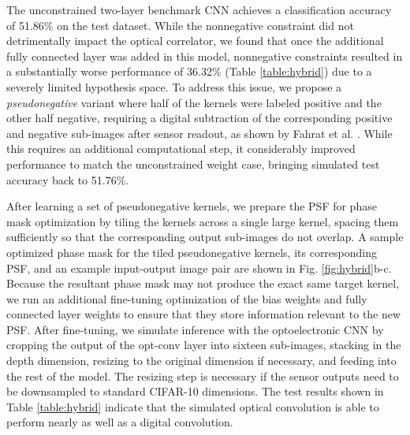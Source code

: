 \documentclass[fleqn,10pt]{wlscirep}
\begin{document}
The unconstrained two-layer benchmark CNN achieves a classification accuracy of 51.86\% on the test dataset. While the nonnegative constraint did not detrimentally impact the optical correlator, we found that once the additional fully connected layer was added in this model, nonnegative constraints resulted in a substantially worse performance of 36.32\% (Table \ref{table:hybrid}) due to a severely limited hypothesis space. To address this issue, we propose a \textit{pseudonegative} variant where half of the kernels were labeled positive and the other half negative, requiring a digital subtraction of the corresponding positive and negative sub-images after sensor readout, as shown by Fahrat et al. \cite{farhat1985optical}. While this requires an additional computational step, it considerably improved performance to match the unconstrained weight case, bringing simulated test accuracy back to 51.76\%.

After learning a set of pseudonegative kernels, we prepare the PSF for phase mask optimization by tiling the kernels across a single large kernel, spacing them sufficiently so that the corresponding output sub-images do not overlap. A sample optimized phase mask for the tiled pseudonegative kernels, its corresponding PSF, and an example input-output image pair are shown in Fig. \ref{fig:hybrid}b-c. Because the resultant phase mask may not produce the exact same target kernel, we run an additional fine-tuning optimization of the bias weights and fully connected layer weights to ensure that they store information relevant to the new PSF. After fine-tuning, we simulate inference with the optoelectronic CNN by cropping the output of the opt-conv layer into sixteen sub-images, stacking in the depth dimension, resizing to the original dimension if necessary, and feeding into the rest of the model. The resizing step is necessary if the sensor outputs need to be downsampled to standard CIFAR-10 dimensions. The test results shown in Table \ref{table:hybrid} indicate that the simulated optical convolution is able to perform nearly as well as a digital convolution. 
\end{document}
